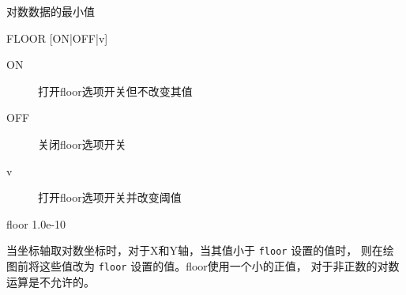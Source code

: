 \label{cmd:floor}

对数数据的最小值

\begin{SACSTX}
FLOOR [ON|OFF|v]
\end{SACSTX}

\begin{description}
\item [ON] 打开floor选项开关但不改变其值
\item [OFF] 关闭floor选项开关
\item [v] 打开floor选项开关并改变阈值
\end{description}

\begin{SACDFT}
floor 1.0e-10
\end{SACDFT}

当坐标轴取对数坐标时，对于X和Y轴，当其值小于 \texttt{floor} 设置的值时，
则在绘图前将这些值改为 \texttt{floor} 设置的值。floor使用一个小的正值，
对于非正数的对数运算是不允许的。
